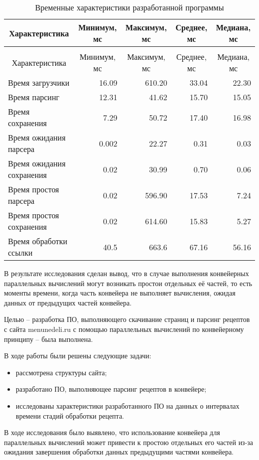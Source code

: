 \begin{longtable}{|p{}|r|r|r|r|}
	\caption{Временные характеристики разработанной программы}\label{tbl:time}	\\
	\hline
	\multicolumn{1}{|c|}{Характеристика} & \multicolumn{1}{|c|}{Минимум, мс} & \multicolumn{1}{|c|}{Максимум, мс} & \multicolumn{1}{|c|}{Среднее, мс} & \multicolumn{1}{|c|}{Медиана, мс} \\
	\hline
	\endfirsthead
	\caption{Временные характеристики разработанной программы}
	\\
	\hline
	\multicolumn{1}{|c|}{Характеристика} & \multicolumn{1}{|c|}{Минимум, мс} & \multicolumn{1}{|c|}{Максимум, мс} & \multicolumn{1}{|c|}{Среднее, мс} & \multicolumn{1}{|c|}{Медиана, мс} \\
	\hline
	\endhead
	\hline
	\endfoot
	\endlastfoot
	Время загрузчики & 16.09 & 610.20 & 33.04 & 22.30 \\
	\hline
	Время парсинг & 12.31 & 41.62 & 15.70 & 15.05 \\
	\hline
	Время сохранения & 7.29 & 50.72 & 17.40 & 16.98 \\
	\hline
	Время ожидания парсера & 0.002 & 22.27 & 0.31 & 0.03 \\
	\hline
	Время ожидания сохранения & 0.02 & 30.99 & 0.70 & 0.06 \\
	\hline
	Время простоя парсера & 0.02 & 596.90 & 17.53 & 7.24 \\
	\hline
	Время простоя сохранения & 0.02 & 614.60 & 15.83 & 5.27 \\
	\hline
	Время обработки ссылки & 40.5 & 663.6 & 67.16 & 56.16 \\
	\hline
\end{longtable}

В результате исследования сделан вывод, что в случае выполнения конвейерных параллельных вычислений могут возникать простои отдельных её частей, то есть моменты времени, когда часть конвейера не выполняет вычисления, ожидая данных от предыдущих частей конвейера.
\clearpage


Целью -- разработка ПО, выполняющего скачивание страниц и парсинг рецептов с сайта menunedeli.ru с помощью параллельных вычислений по конвейерному принципу -- была выполнена.

В ходе работы были решены следующие задачи:
\begin{itemize}
	\item рассмотрена структуры сайта;
	\item разработано ПО, выполняющее парсинг рецептов в конвейере;
	\item исследованы характеристики разработанного ПО на данных о интервалах времени стадий обработки рецепта.
\end{itemize}

В ходе исследования было выявлено, что использование конвейера для параллельных вычислений может привести к простою отдельных его частей из-за ожидания завершения обработки данных предыдущими частями конвейера.






